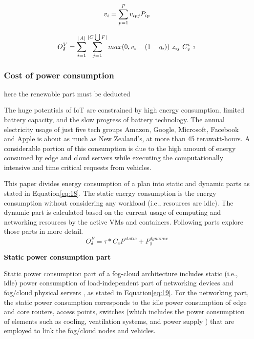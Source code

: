 \documentclass[twocolumn]{article}
\begin{document}
\begin{equation}
v_{i} = \sum_{p=1}^{P} v_{ipj} P_{ip}
\label{eq:10}\\
\end{equation}

\begin{equation}
O_{\delta}^{V} = \sum_{i=1}^{|A|}\sum_{j=1}^{|{C}\bigcup{F}|}max (0 , v_{i}-(1-q_{i})) \ z_{ij} \ C_{v}^{i} \ \tau 
\label{eq:10}\\
\end{equation}

\subsubsection{Cost of power consumption}\label{subsec:localcost-pc}
here the renewable part must be deducted
\par The huge potentials of IoT are constrained by high energy consumption, limited battery capacity, and the slow progress of battery technology\cite{zhou2021green}. The annual electricity usage of just five tech groups Amazon, Google, Microsoft, Facebook and Apple is about as much as New Zealand’s, at more than 45 terawatt-hours. A considerable portion of this consumption is due to the high amount of energy consumed by edge and cloud servers while executing the computationally intensive and time critical requests from vehicles\cite{ismail2021escove}. 
\par This paper divides energy consumption of a plan into static and dynamic parts as stated in Equation\ref{eq:18}. The static energy consumption is the energy consumption without considering any workload (i.e., resources are idle)\cite{kurpicz2016much}. The dynamic part is calculated based on the current usage of computing and networking resources by the active VMs and containers\cite{ahvar2019estimating,heinrich2017predicting,salaht2020overview}. Following parts explore those parts in more detail.
\begin{equation}
O_{\delta}^{E} = \tau * C_{e} P^{static} + P_{\delta}^{dynamic}
\label{eq:18}
\end{equation}

\makebox[4.0cm][c]{}
\parbox[c]{6.0cm}{\textbf{Static power consumption part}}
\par Static power consumption part of a fog-cloud architecture includes static (i.e., idle) power consumption of load-independent part of networking devices and fog/cloud physical servers , as stated in Equation\ref{eq:19}. For the networking part, the static power consumption corresponds to the idle power consumption of edge and core routers, access points, switches (which includes the power consumption of elements such as cooling, ventilation systems, and power supply \cite{vishwanath2014modeling}) that are employed to link the fog/cloud nodes and vehicles. 
\end{document}
